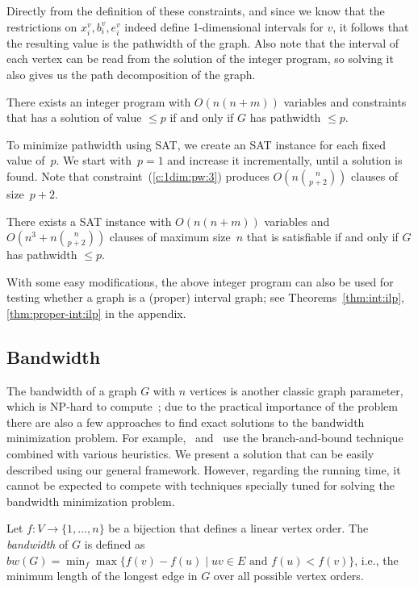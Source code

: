 \documentclass[runningheads]{llncs}
\newcounter{constr}
\begin{document}
Directly from the definition of these constraints, and since we
know that the restrictions on $x_i^v,b_i^v,e_i^v$ indeed define
1-dimensional intervals for $v$, it follows that the resulting
value is the pathwidth of the graph.  Also note that the interval
of each vertex can be read from the solution of the integer
program, so solving it also gives us the path decomposition of
the graph.

\begin{theorem}
There exists an integer program with $O(n(n+m))$ variables
and constraints that has a solution of value $\leq p$ if and only
if $G$ has pathwidth $\leq p$.
\end{theorem}

To minimize pathwidth using SAT, we create an SAT instance for each fixed value of~$p$.
We start with~$p=1$ and increase it incrementally,
until a solution is found.
Note that constraint~(\ref{c:1dim:pw:3}) produces $O(n \binom{n}{p+2})$
clauses of size~$p+2$.
\begin{theorem}
There exists a SAT instance with $O(n(n+m))$ variables
and $O(n^3 + n \binom{n}{p+2})$ clauses
of maximum size~$n$ that is satisfiable if and only
if $G$ has pathwidth $\leq p$.
\label{thm:pw:sat}
\end{theorem}
\par
With some easy modifications, the above integer program can also be used 
for testing whether a graph is a (proper) interval graph; see 
Theorems~\ref{thm:int:ilp},\ref{thm:proper-int:ilp} 
in the appendix.

\fi

\subsection{Bandwidth}\label{sec:bandwidth}
The bandwidth of a graph $G$ with $n$ vertices is another classic graph parameter, which is NP-hard to compute~\cite{ccdg-bpgms-82}; due to the practical importance of the problem there are also a few approaches to find exact solutions to the bandwidth minimization problem.
For example,~\cite{bandwidth-exact} and~\cite{mcp-bbambm-08} use the
branch-and-bound technique combined with various heuristics. We
present a solution that can be easily described using our general
framework. However, regarding the running time, it cannot be expected
to compete with techniques specially tuned for solving the bandwidth
minimization problem.

Let $f: V \rightarrow \{1, \dots, n\}$ be a bijection that defines a
linear vertex order. The \emph{bandwidth} of $G$ is defined as $bw(G)
= \min_f \max \{f(v) - f(u) \mid uv \in E \text{ and } f(u) < f(v)\}$,
i.e., the minimum length of the longest edge in $G$ over all possible
vertex orders.
\end{document}
